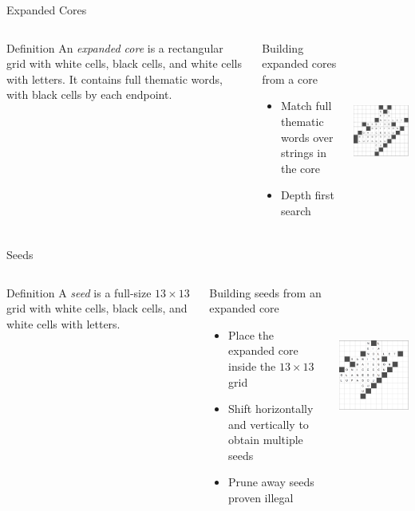\documentclass[aspectratio=169,usenames,dvipsnames]{beamer}
\newcommand{\bei}{\begin{itemize}}
\newcommand{\eei}{\end{itemize}}
\newcommand{\ie}{\item}
\numberwithin{equation}{section}
\numberwithin{theorem}{section}
\numberwithin{lem}{section}
\numberwithin{df}{section}
\begin{document}
\begin{frame}{Expanded Cores}

\begin{columns}
\begin{block}{Definition}
An \emph{expanded core} is a rectangular grid with white cells, black cells, and white cells with letters.
It contains full thematic words, with black cells by each endpoint.
\end{block}
\begin{block}{Building expanded cores from a core}
\bei
\ie Match full thematic words over strings in the core
\ie Depth first search
\eei
\end{block}
\centering
\includegraphics[height=6cm]{_plots/extcore-alive-0-puzzle-72-2975-1488--1--1.pdf}
\end{columns}

\end{frame}


\begin{frame}{Seeds}

\begin{columns}
\begin{block}{Definition}
A \emph{seed} is a full-size $13\times13$ grid with white cells, black cells, and white cells with letters.
\end{block}
\begin{block}{Building seeds from an expanded core}
\bei
\ie Place the expanded core inside the $13\times13$ grid
\ie Shift horizontally and vertically to obtain multiple seeds
\ie Prune away seeds proven illegal
\eei
\end{block}
\centering
\includegraphics[height=6cm]{_plots/alive-0-puzzle-72-2975-1488--1--1.png} \hspace{1cm}
\end{columns}

\end{frame}
\end{document}
